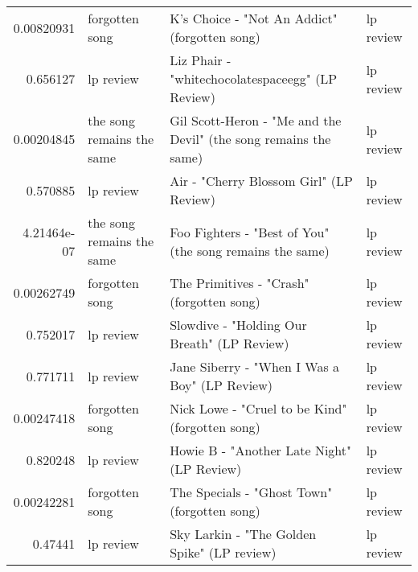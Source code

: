 \documentclass[letterpaper,10pt]{article}
\begin{document}
\begin{table}[H]
\begin{adjustbox}{max width=\linewidth}
\begin{tabular}{rlll}
  0.00820931  & forgotten song            & K's Choice - "Not An Addict" (forgotten song)                                                                & lp review                 \\
  0.656127    & lp review                 & Liz Phair - "whitechocolatespaceegg" (LP Review)                                                             & lp review                 \\
  0.00204845  & the song remains the same & Gil Scott-Heron - "Me and the Devil" (the song remains the same)                                             & lp review                 \\
  0.570885    & lp review                 & Air - "Cherry Blossom Girl" (LP Review)                                                                      & lp review                 \\
  4.21464e-07 & the song remains the same & Foo Fighters - "Best of You" (the song remains the same)                                                     & lp review                 \\
  0.00262749  & forgotten song            & The Primitives - "Crash" (forgotten song)                                                                    & lp review                 \\
  0.752017    & lp review                 & Slowdive - "Holding Our Breath" (LP Review)                                                                  & lp review                 \\
  0.771711    & lp review                 & Jane Siberry - "When I Was a Boy" (LP Review)                                                                & lp review                 \\
  0.00247418  & forgotten song            & Nick Lowe - "Cruel to be Kind" (forgotten song)                                                              & lp review                 \\
  0.820248    & lp review                 & Howie B - "Another Late Night" (LP Review)                                                                   & lp review                 \\
  0.00242281  & forgotten song            & The Specials - "Ghost Town" (forgotten song)                                                                 & lp review                 \\
  0.47441     & lp review                 & Sky Larkin - "The Golden Spike" (LP review)                                                                  & lp review                 \\

\end{tabular}
\end{adjustbox}
\end{table}
\end{document}
